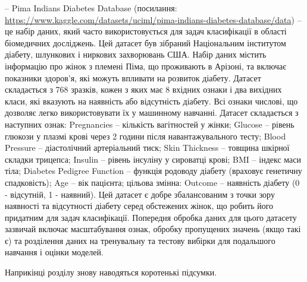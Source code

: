 -- Pima Indians Diabetes Database (посилання: \href{https://www.kaggle.com/datasets/uciml/pima-indians-diabetes-database/data}{https://www.kaggle.com/datasets/uciml/pima-indians-diabetes-database/data}) -- це набір даних, який часто використовується для задач класифікації в області біомедичних досліджень. Цей датасет був зібраний Національним інститутом діабету, шлункових і ниркових захворювань США. Набір даних містить інформацію про жінок з племені Піма, що проживають в Арізоні, та включає показники здоров'я, які можуть впливати на розвиток діабету. Датасет складається з 768 зразків, кожен з яких має 8 вхідних ознаки і два вихідних класи, які вказують на наявність або відсутність діабету. Всі ознаки числові, що дозволяє легко використовувати їх у машинному навчанні. Датасет складається з наступних ознак: Pregnancies -- кількість вагітностей у жінки; Glucose -- рівень глюкози у плазмі крові через 2 години після навантажувального тесту; Blood Pressure -- діастолічний артеріальний тиск; Skin Thickness -- товщина шкірної складки трицепса; Insulin -- рівень інсуліну у сироватці крові; BMI -- індекс маси тіла; Diabetes Pedigree Function -- функція родоводу діабету (враховує генетичну спадковість); Age -- вік пацієнта; цільова змінна: Outcome -- наявність діабету (0 - відсутній, 1 - наявний).
Цей датасет є добре збалансованим з точки зору наявності та відсутності діабету серед обстежених жінок, що робить його придатним для задач класифікації. Попередня обробка даних для цього датасету зазвичай включає масштабування ознак, обробку пропущених значень (якщо такі є) та розділення даних на тренувальну та тестову вибірки для подальшого навчання і оцінки моделей.








\chapconclude{\ref{chap:theory}}

Наприкінці розділу знову наводяться коротенькі підсумки.